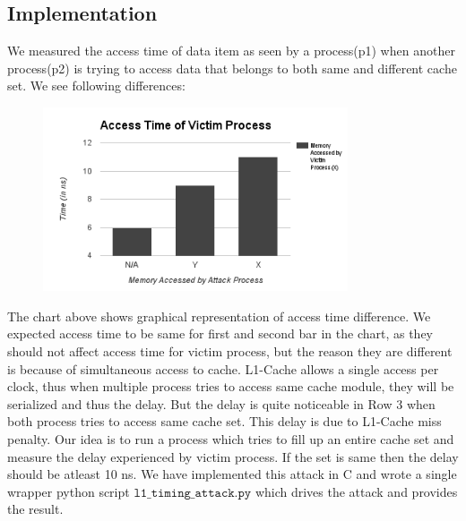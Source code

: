 \documentclass[twocolumn]{IEEEtran}
\begin{document}
\subsection {Implementation}
We measured the access time of data item as seen by a process(p1) when another process(p2) is trying to access data that belongs to both same and different cache set. We see following differences:
\begin{center}
\end{center}
\begin{figure}[H]
  \centering
  \includegraphics[width=90mm]{chart}
\end{figure}
The chart above shows graphical representation of access time difference. We expected access time to be same for first and second bar in the chart, as they should not affect access time for victim process, but the reason they are different is because of simultaneous access to cache. L1-Cache allows a single access per clock, thus when multiple process tries to access same cache module, they will be serialized and thus the delay. But the delay is quite noticeable in Row 3 when both process tries to access same cache set. This delay is due to L1-Cache miss penalty. Our idea is to run a process which tries to fill up an entire cache set and measure the delay experienced by victim process. If the set is same then the delay should be atleast 10 ns. We have implemented this attack in C and wrote a single wrapper python script $\texttt{l1\_timing\_attack.py}$ which drives the attack and provides the result.
\end{document}
